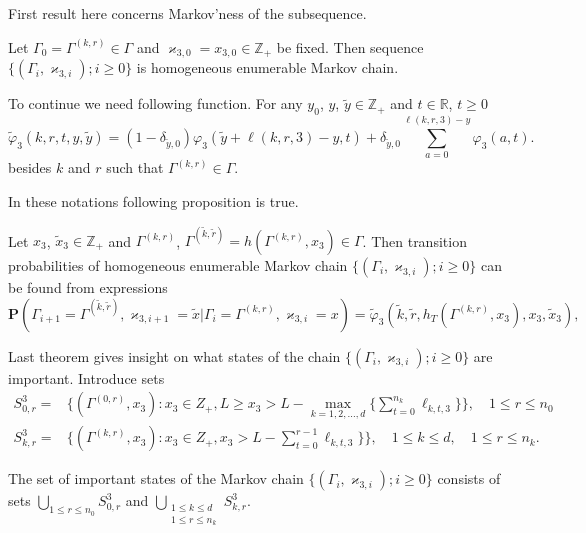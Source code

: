 \documentclass[10pt]{article}
\renewcommand{\Pr}{{\mathbf P}}
\begin{document}
First result here concerns Markov'ness of the subsequence.
\begin{thm}
Let $\Gamma_0=\Gamma^{(k,r)}\in \Gamma$ and $\varkappa_{3,0}=x_{3,0}\in \mathbb{Z}_+$ be fixed. Then sequence $\{(\Gamma_i, \varkappa_{3, i}); i \geqslant 0\}$ is homogeneous enumerable Markov chain.
\end{thm}

To continue we need following function.
For any $y_0$, $y$, $\tilde{y} \in \mathbb{Z}_+$ and $t \in \mathbb{R}$, $t\geqslant 0$ 
\begin{equation}
\widetilde{\varphi}_3(k,r,t,y,\tilde{y}) = (1-\delta_{\tilde{y},0}) \varphi_3(\tilde{y} + \ell(k,r,3)-y,t)  +\delta_{\tilde{y},0}\sum_{a=0}^{\ell(k,r,3)-y} \varphi_3(a,t).
\label{tildephi}
\end{equation}
besides $k$ and $r$ such that $\Gamma^{(k,r)}\in \Gamma$.

In these notations following proposition is true.
\begin{thm}
Let $x_3$, $\tilde{x}_3\in \mathbb{Z}_+$ and $\Gamma^{(k,r)}$, $\Gamma^{(\tilde{k},\tilde{r})}=h(\Gamma^{(k,r)},x_3) \in \Gamma$. Then transition probabilities of  homogeneous enumerable Markov chain $\{(\Gamma_i, \varkappa_{3, i}); i \geqslant 0\}$ can be found from expressions
\begin{equation}
\Pr (\Gamma_{i+1}=\Gamma^{(\tilde{k},\tilde{r})},\varkappa_{3,i+1}=\tilde{x}|\Gamma_{i}=\Gamma^{(k,r)},\varkappa_{3,i}=x) 
= \widetilde{\varphi}_3(\tilde{k},\tilde{r},h_T(\Gamma^{(k,r)},x_3),x_3,\tilde{x}_3),
\label{transitionToProve:three}
\end{equation}
\end{thm}

Last theorem gives insight on what states of the chain $\{(\Gamma_i, \varkappa_{3, i}); i \geqslant 0\}$ are important. Introduce sets
\begin{equation*}
\begin{aligned}
S^3_{0,r} = & \{(\Gamma^{(0,r)},x_3) \colon x_3\in Z_+, L \geqslant x_3 > L - \max\limits_{k=1, 2, \ldots, d}\{\sum_{t=0}^{n_k} \ell_{k,t,3}\}\}, \quad 1 \leqslant r \leqslant n_0 \\
S^3_{k,r} = & \{(\Gamma^{(k,r)},x_3) \colon x_3\in Z_+, x_3 > L - \sum_{t=0}^{r-1} \ell_{k,t,3}\} \}, \quad 1 \leqslant k \leqslant d, \quad 1 \leqslant r \leqslant n_k.
\end{aligned}
\end{equation*}

\begin{thm}
The set of important states of the Markov chain $\{(\Gamma_i, \varkappa_{3, i}); i \geqslant 0\}$  consists of sets $\bigcup\limits_{1 \leqslant r \leqslant n_0}S^3_{0,r}$ and $\bigcup\limits_{\substack{1 \leqslant k \leqslant d\\ 1 \leqslant r \leqslant n_k}} S^3_{k,r}$.
\end{thm}
\end{document}
